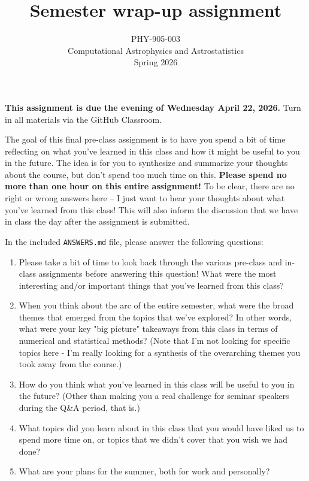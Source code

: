 \documentclass[10pt]{article}
\title{Semester wrap-up assignment}
\author{PHY-905-003\\Computational Astrophysics and
  Astrostatistics\\Spring 2026}
\date{} %
\begin{document}
 
\maketitle

\vspace{-5mm}

\noindent
\textbf{This assignment is due the evening of Wednesday April 22, 2026.}
 Turn in all materials via the GitHub Classroom.

\vspace{5mm}


The goal of this final pre-class assignment is to have you spend a bit
of time reflecting on what you've learned in this class and how it
might be useful to you in the future.  The idea is for you to
synthesize and summarize your thoughts about the course, but don't
spend too much time on this.  \textbf{Please spend no more than one
hour on this entire assignment!}  To be clear, there are no right or
wrong answers here -- I just want to hear your thoughts about what
you've learned from this class!  This will also inform the discussion
that we have in class the day after the assignment is submitted.

\vspace{3mm}

\noindent
In the included \texttt{ANSWERS.md} file, please answer the following
questions:

\begin{enumerate}

\item Please take a bit of time to look back through the various 
pre-class and in-class assignments before answering this question!  What 
were the most interesting and/or important things that you've learned from 
this class?

\item When you think about the arc of the entire semester, what 
were the broad themes that emerged from the topics that we've explored?  
In other words, what were your key "big picture" takeaways from this class 
in terms of numerical and statistical methods?  (Note that I'm not looking
for specific topics here - I'm really looking for a synthesis of the 
overarching themes you took away from the course.)

\item How do you think what you've learned in this class will be 
useful to you in the future?  (Other than making you a real challenge for 
seminar speakers during the Q\&A period, that is.)

\item What topics did you learn about in this class that you would 
have liked us to spend more time on, or topics that we didn't cover that you 
wish we had done?

\item What are your plans for the summer, both for work and personally?

\end{enumerate}
\end{document}
